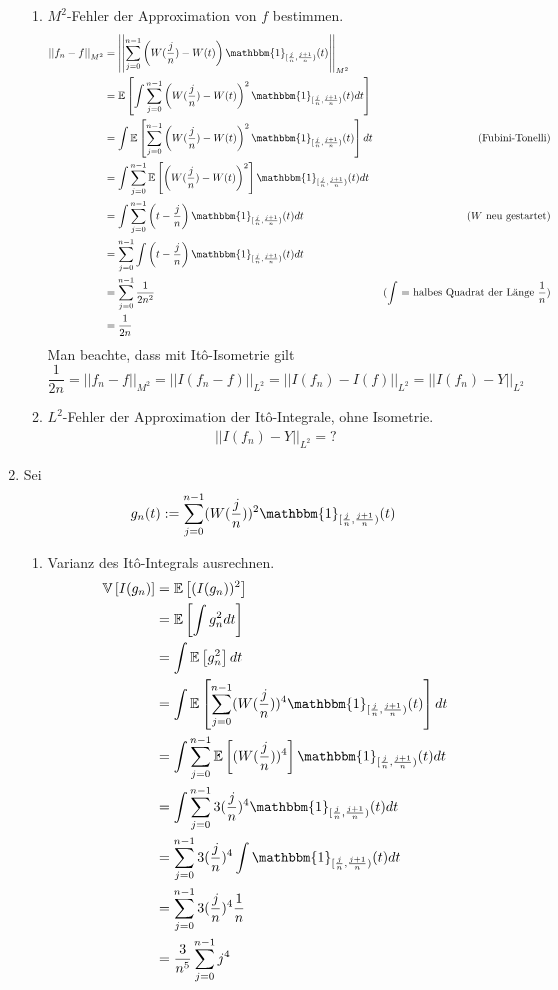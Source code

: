 \documentclass[a4paper,11pt,notitlepage,fullpage]{article}
\newcommand{\Ee}[1]{\mathbb E\left[#1\right]}
\newcommand{\Vv}[1]{\mathbb V\left[#1\right]}
\newcommand{\indd}[1]{\mathbbm{1}_{#1}}
\newcommand{\norm}[2]{\left|\left|{#1}\right|\right|_{#2}}
\begin{document}
\begin{enumerate}
\begin{enumerate}
\item $M^2$-Fehler der Approximation von $f$ bestimmen.
\begin{align*}
\norm{f_n-f}{M^2} &= \norm{\sum_{j=0}^{n-1} \left(W(\frac{j}{n})-W(t)\right) \indd{[\frac{j}{n}, \frac{j+1}{n})}(t)}{M^2}\\
&= \Ee{\int \sum_{j=0}^{n-1} \left(W(\frac{j}{n})-W(t)\right)^2 \indd{[\frac{j}{n}, \frac{j+1}{n})}(t) dt}\\
&= \int \Ee{\sum_{j=0}^{n-1} \left(W(\frac{j}{n})-W(t)\right)^2 \indd{[\frac{j}{n}, \frac{j+1}{n})}(t) } dt &\text{(Fubini-Tonelli)}\\
&= \int \sum_{j=0}^{n-1} \Ee{\left(W(\frac{j}{n})-W(t)\right)^2} \indd{[\frac{j}{n}, \frac{j+1}{n})}(t)  dt\\
&= \int \sum_{j=0}^{n-1} \left(t-\frac{j}{n}\right) \indd{[\frac{j}{n}, \frac{j+1}{n})}(t)  dt & \text{($W$ neu gestartet)}\\
&=  \sum_{j=0}^{n-1} \int\left(t-\frac{j}{n}\right) \indd{[\frac{j}{n}, \frac{j+1}{n})}(t)  dt \\
&=  \sum_{j=0}^{n-1} \frac{1}{2n^2} & \text{($\int$ = halbes Quadrat der Länge $\frac{1}{n}$)}\\
&= \frac{1}{2n}
\end{align*}
Man beachte, dass mit Itô-Isometrie gilt
$$\frac{1}{2n} = \norm{f_n-f}{M^2} = \norm{I(f_n-f)}{L^2} = \norm{I(f_n)-I(f)}{L^2} = \norm{I(f_n)-Y}{L^2}$$

\item $L^2$-Fehler der Approximation der Itô-Integrale, ohne Isometrie.
\begin{align*}
\norm{I(f_n)-Y}{L^2} = ?
\end{align*}
\end{enumerate}


\item Sei
$$g_n(t) := \sum_{j=0}^{n-1} (W(\frac{j}{n}))^2 \indd{[\frac{j}{n}, \frac{j+1}{n})}(t)$$
\begin{enumerate}
\item Varianz des Itô-Integrals ausrechnen.
\begin{align*}
\Vv{I(g_n)} &= \Ee{(I(g_n))^2}\\
&=\Ee{\int g_n^2 dt}\\
&= \int \Ee{g_n^2} dt\\
&= \int \Ee{\sum_{j=0}^{n-1} (W(\frac{j}{n}))^4 \indd{[\frac{j}{n}, \frac{j+1}{n})}(t)} dt\\
&= \int \sum_{j=0}^{n-1} \Ee{(W(\frac{j}{n}))^4} \indd{[\frac{j}{n}, \frac{j+1}{n})}(t) dt\\
&= \int \sum_{j=0}^{n-1} 3(\frac{j}{n})^4 \indd{[\frac{j}{n}, \frac{j+1}{n})}(t) dt\\
&= \sum_{j=0}^{n-1} 3(\frac{j}{n})^4 \int \indd{[\frac{j}{n}, \frac{j+1}{n})}(t) dt\\
&= \sum_{j=0}^{n-1} 3(\frac{j}{n})^4 \frac{1}{n}\\
&= \frac{3}{n^5} \sum_{j=0}^{n-1} j^4 \\
\end{align*}


\end{enumerate}
\end{enumerate}
\end{document}

